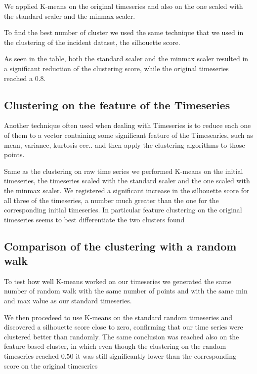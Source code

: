 We applied K-means on the original timeseries and also on the one scaled with the standard scaler and the minmax scaler.

To find the best number of cluster we used the same technique that we used in the clustering of the incident dataset, the silhouette score.

As seen in the table, both the standard scaler and the minmax scaler resulted in a significant reduction of the clustering score, while the original timeseries reached a 0.8. 


\subsection{Clustering on the feature of the Timeseries}

Another technique often used when dealing with Timeseries is to reduce each one of them to a vector containing some significant feature of the Timesearies, such as mean, variance, kurtosis ecc..  and then apply the clustering algorithms to those points.

Same as the clustering on raw time series we performed K-means on the initial timeseries, the timeseries scaled with the standard scaler and the one scaled with the minmax scaler.
We registered a significant increase in the silhouette score for all three of the timeseries, a number much greater than the one for the corresponding initial timeseries.
In particular feature clustering on the original timeseries seems to best differentiate the two clusters found





\subsection{Comparison of the clustering with a random walk}

To test how well K-means worked on our timeseries we generated the same number of random walk with the same number of points and with the same min and max value as our standard timeseries.

We then procedeed to use K-means on the standard random timeseries and discovered a silhouette score close to zero, confirming that our time series were clustered better than randomly.
The same conclusion was reached also on the feature based cluster, in which even though the clustering on the random timeseries reached $0.50$ it was still significantly lower than the corresponding score on the original timeseries




